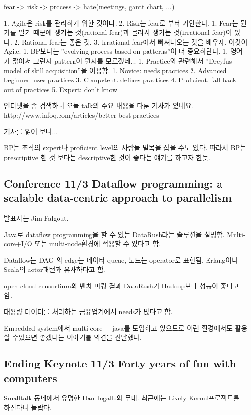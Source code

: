 \documentclass[a4paper]{article}
\begin{document}
fear -> risk -> process -> hate(meetings, gantt chart, ...)
 
1. Agile은 risk를 관리하기 위한 것이다.
2. Risk는 fear로 부터 기인한다.
1. Fear는 뭔가를 알기 때문에 생기는 것(rational fear)과 몰라서 생기는 것(irrational fear)이 있다.
2. Rational fear는 좋은 것.
3. Irrational fear에서 빠져나오는 것을 배우자. 이것이 Agile.
1. BP보다는 ”evolving process based on patterns”이 더 중요하단다.
1. 영어가 짧아서 그런지 pattern이 뭔지를 모르겠네...
1. Practice와 관련해서 ”Dreyfus model of skill acquisition”을 이용함.
1. Novice: needs practices
2. Advanced beginner: uses practices
3. Competent: defines practices
4. Proficient: fall back out of practices
5. Expert: don’t know.
 
인터넷을 좀 검색하니 오늘 talk의 주요 내용을 다룬 기사가 있네요.
http://www.infoq.com/articles/better-best-practices
 
기사를 읽어 보니...

BP는 조직의 expert나 proficient level의 사람들 발목을 잡을 수도 있다.
따라서 BP는 prescriptive 한 것 보다는 descriptive한 것이 좋다는 얘기를
하고자 한듯.
 
\subsection{Conference 11/3 Dataflow programming: a scalable
  data-centric approach to parallelism}
 
발표자는 Jim Falgout.
 
Java로 dataflow programming을 할 수 있는 DataRush라는 솔루션을 설명함.
Multi-core+I/O 또는 multi-node환경에 적용할 수 있다고 함.
 
Dataflow는 DAG 의 edge는 데이터 queue, 노드는 operator로 표현됨.
Erlang이나 Scala의 actor패턴과 유사하다고 함.
 
open cloud consortium의 벤치 마킹 결과 DataRush가 Hadoop보다 성능이 좋다고 함.
 
대용량 데이터를 처리하는 금융업계에서 needs가 많다고 함. 
 
Embedded system에서 multi-core + java를 도입하고 있으므로 이런
환경에서도 활용할 수있으면 좋겠다는 이야기를 의견을 전달했다.
 
\subsection{Ending Keynote 11/3 Forty years of fun with computers}
 
Smalltalk 동네에서 유명한 Dan Ingalls의 무대.
최근에는  Lively Kernel프로젝트를 하신다니 놀랍다.
 
\end{document}
